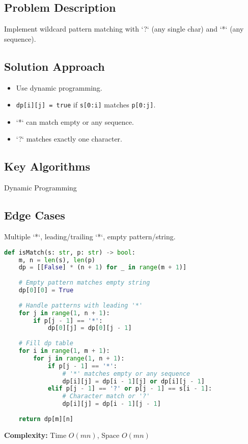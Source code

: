 \documentclass[10pt, a4paper]{article}
\begin{document}
\subsection*{Problem Description}
Implement wildcard pattern matching with `?` (any single char) and `*` (any sequence).

\subsection*{Solution Approach}
\begin{itemize}
    \item Use dynamic programming.
    \item \texttt{dp[i][j] = true} if \texttt{s[0:i]} matches \texttt{p[0:j]}.
    \item `*` can match empty or any sequence.
    \item `?` matches exactly one character.
\end{itemize}

\subsection*{Key Algorithms}
Dynamic Programming

\subsection*{Edge Cases}
Multiple `*`, leading/trailing `*`, empty pattern/string.

\begin{lstlisting}[language=Python]
def isMatch(s: str, p: str) -> bool:
    m, n = len(s), len(p)
    dp = [[False] * (n + 1) for _ in range(m + 1)]
    
    # Empty pattern matches empty string
    dp[0][0] = True
    
    # Handle patterns with leading '*'
    for j in range(1, n + 1):
        if p[j - 1] == '*':
            dp[0][j] = dp[0][j - 1]
    
    # Fill dp table
    for i in range(1, m + 1):
        for j in range(1, n + 1):
            if p[j - 1] == '*':
                # '*' matches empty or any sequence
                dp[i][j] = dp[i - 1][j] or dp[i][j - 1]
            elif p[j - 1] == '?' or p[j - 1] == s[i - 1]:
                # Character match or '?'
                dp[i][j] = dp[i - 1][j - 1]
    
    return dp[m][n]
\end{lstlisting}
\textbf{Complexity:} Time $O(mn)$, Space $O(mn)$
\end{document}
